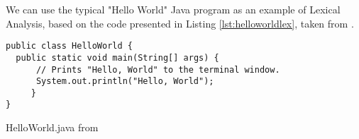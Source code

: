 We can use the typical "Hello World" Java program as an example of Lexical Analysis, based on the code presented in Listing \ref{lst:helloworldlex}, taken from \cite{SEDGEWICK:2011}.

\begin{listing}
\begin{verbatim}
public class HelloWorld {
  public static void main(String[] args) {
      // Prints "Hello, World" to the terminal window.
      System.out.println("Hello, World");
     }
}
\end{verbatim}
\caption{HelloWorld.java from \cite{SEDGEWICK:2011}} \label{lst:helloworldlex}
\end{listing}
